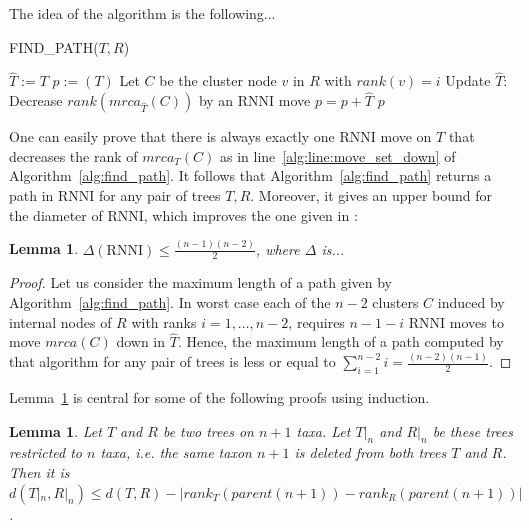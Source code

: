 \documentclass{amsart}
\newcommand{\rnni}{\mathrm{RNNI}}
\newtheorem{lemma}[definition]{Lemma}
\begin{document}
The idea of the algorithm is the following...

\begin{algorithm}[H]
\caption{FIND\_PATH($T,R$)}
\label{alg:find_path}
\begin{algorithmic}[1]
	\STATE $\hat{T} := T$
	\STATE $p := (T)$
		\STATE Let $C$ be the cluster node $v$ in $R$ with $rank(v) = i$
			\STATE Update $\hat{T}$: Decrease $rank(mrca_{\hat{T}}(C))$ by an $\rnni$ move \label{alg:line:move_set_down}
			\STATE $p = p+\hat{T}$
		\ENDWHILE
	\ENDFOR
	\RETURN $p$
\end{algorithmic}
\end{algorithm}

One can easily prove that there is always exactly one $\rnni$ move on $T$ that decreases the rank of $mrca_T(C)$ as in line~\ref{alg:line:move_set_down} of Algorithm~\ref{alg:find_path}.
It follows that Algorithm~\ref{alg:find_path} returns a path in $\rnni$ for any pair of trees $T,R$.
Moreover, it gives an upper bound for the diameter of $\rnni$, which improves the one given in \autocite{Gavryushkin2017}:

\begin{lemma}
$\Delta(\rnni) \leq \frac{(n-1)(n-2)}{2}$, where $\Delta$ is...
\end{lemma}

\begin{proof}
    Let us consider the maximum length of a path given by Algorithm~\ref{alg:find_path}.
    In worst case each of the $n-2$ clusters $C$ induced by internal nodes of $R$ with ranks $i = 1, \dots, n-2$, requires $n-1-i$ $\rnni$ moves to move $mrca(C)$ down in $\hat{T}$.
	Hence, the maximum length of a path computed by that algorithm for any pair of trees is less or equal to $\sum\limits_{i = 1}^{n-2} i = \frac{(n-2)(n-1)}{2}$.
\end{proof}

Lemma~\ref{lemma:distance_delete_taxon} is central for some of the following proofs using induction.

\begin{lemma}
    Let $T$ and $R$ be two trees on $n+1$ taxa.
    Let $T|_n$ and $R|_n$ be these trees restricted to $n$ taxa, i.e. the same taxon $n+1$ is deleted from both trees $T$ and $R$.
    Then it is $d(T|_n, R|_n) \leq d(T,R) - |rank_T(parent(n+1)) - rank_R(parent(n+1))|$.
    \label{lemma:distance_delete_taxon}
\end{lemma}
\end{document}
